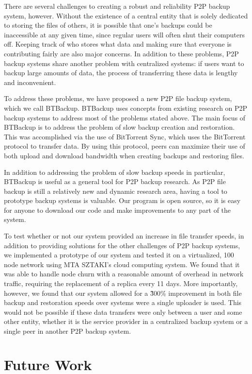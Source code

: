 \documentclass[12pt]{report}
\begin{document}
There are several challenges to creating a robust and reliability P2P backup system, however. Without the existence of a central entity that is solely dedicated to storing the files of others, it is possible that one's backups could be inaccessible at any given time, since regular users will often shut their computers off. Keeping track of who stores what data and making sure that everyone is contributing fairly are also major concerns. In addition to these problems, P2P backup systems share another problem with centralized systems: if users want to backup large amounts of data, the process of transferring these data is lengthy and inconvenient.

To address these problems, we have proposed a new P2P file backup system, which we call BTBackup. BTBackup uses concepts from existing research on P2P backup systems to address most of the problems stated above. The main focus of BTBackup is to address the problem of slow backup creation and restoration. This was accomplished via the use of BitTorrent Sync, which uses the BitTorrent protocol to transfer data. By using this protocol, peers can maximize their use of both upload and download bandwidth when creating backups and restoring files.

In addition to addressing the problem of slow backup speeds in particular, BTBackup is useful as a general tool for P2P backup research. As P2P file backup is still a relatively new and dynamic research area, having a tool to prototype backup systems is valuable. Our program is open source, so it is easy for anyone to download our code and make improvements to any part of the system.

To test whether or not our system provided an increase in file transfer speeds, in addition to providing solutions for the other challenges of P2P backup systems, we implemented a prototype of our system and tested it on a virtualized, 100 node network using MTA SZTAKI's cloud computing system. We found that it was able to handle node churn with a reasonable amount of overhead in network traffic, requiring the replacement of a replica every 11 days. More importantly, however, we found that our system allowed for a \~300\% improvement in both file backup and restoration speeds over systems were a single uploader is used. This would not be possible if these data transfers were only between a user and some other entity, whether it is the service provider in a centralized backup system or a single peer in another P2P backup system.

\section{Future Work}
\end{document}
